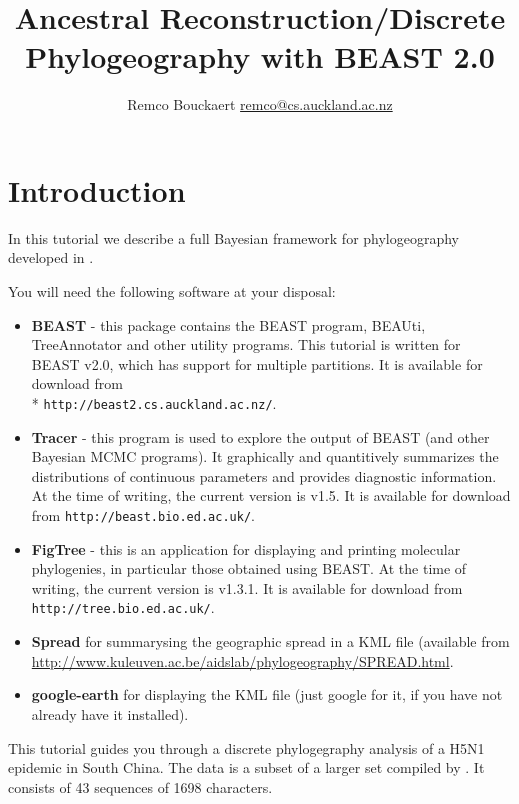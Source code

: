 \documentclass{article}
\newcommand{\BEASTVersion}{2.0}
\newcommand{\TracerVersion}{1.5}
\newcommand{\FigTreeVersion}{1.3.1}
\begin{document}
\title{Ancestral Reconstruction/Discrete Phylogeography with BEAST 2.0}
\author{Remco Bouckaert \url{remco@cs.auckland.ac.nz}}
\maketitle

\section{Introduction}


In this tutorial we describe a full Bayesian framework for phylogeography developed in  \cite{Lemey:2009uq}.

You will need the following software at your disposal:

\begin{itemize}

\item {\bf BEAST} - this package contains the BEAST program, BEAUti, TreeAnnotator and other utility programs. This tutorial is written for BEAST v{\BEASTVersion}, which has support for multiple partitions. It is available for download from \\* \texttt{http://beast2.cs.auckland.ac.nz/}.
\item {\bf Tracer} - this program is used to explore the output of BEAST (and other Bayesian MCMC programs). It graphically and
quantitively summarizes the distributions of continuous parameters and provides diagnostic information. At the time of
writing, the current version is v{\TracerVersion}. It is available for download from \texttt{http://beast.bio.ed.ac.uk/}.
\item {\bf FigTree} - this is an application for displaying and printing molecular phylogenies, in particular those obtained using
BEAST. At the time of writing, the current version is v{\FigTreeVersion}. It is available for download from \texttt{http://tree.bio.ed.ac.uk/}.
\item {\bf Spread} for summarysing the geographic spread in a KML file (available from \url{http://www.kuleuven.ac.be/aidslab/phylogeography/SPREAD.html}.
\item {\bf google-earth} for displaying the KML file (just google for it, if you have not already have it installed).
\end{itemize}


This tutorial guides you through a discrete phylogegraphy analysis of a H5N1 epidemic in South China.
The data is a subset of a larger set compiled by \cite{wallace:2007st}.
It consists of 43 sequences of 1698 characters.
\end{document}

